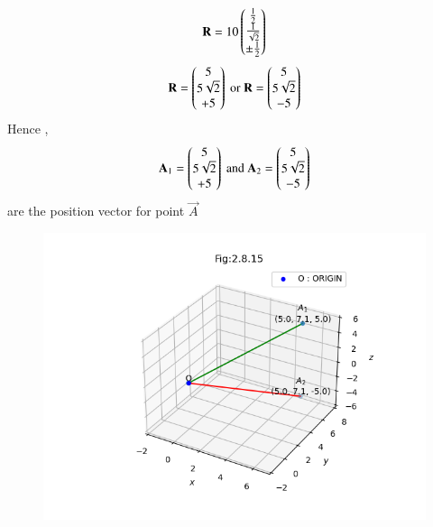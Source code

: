 \documentclass[journal]{IEEEtran}
\numberwithin{equation}{enumi}
\numberwithin{figure}{enumi}
\begin{document}
\begin{align}
    \mathbf{R} = 10\begin{pmatrix}\frac{1}{2} \\ \frac{1}{\sqrt{2}} \\ \pm \frac{1}{2}\end{pmatrix}
\end{align}
\begin{align}
    \mathbf{R} = \begin{pmatrix}5 \\ 5\sqrt{2} \\ +5\end{pmatrix} \text{ or } \mathbf{R} = \begin{pmatrix}5 \\ 5\sqrt{2} \\ -5\end{pmatrix} 
\end{align}
Hence , 
\begin{align}
    \mathbf{A}_1 = \begin{pmatrix}5 \\ 5\sqrt{2} \\ +5\end{pmatrix} \text{ and } \mathbf{A}_2 = \begin{pmatrix}5 \\ 5\sqrt{2} \\ -5\end{pmatrix} 
\end{align}
are the position vector for point $\vec{A}$



\begin{figure}[H]
    \centering
    \includegraphics[width=1\columnwidth]{figs/vector1.png}
    \caption*{}
    \label{fig:}
\end{figure}
\end{document}
